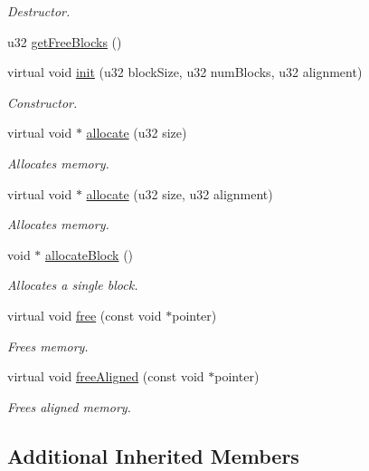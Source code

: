 \begin{DoxyCompactItemize}
\begin{DoxyCompactList}\small\item\em Destructor. \end{DoxyCompactList}\item 
u32 \hyperlink{classDE_1_1PoolAllocator_abb72ae0c4f9cc376cdab99095bd02575}{get\+Free\+Blocks} ()
\item 
virtual void \hyperlink{classDE_1_1PoolAllocator_acd4f99952bffbe85c229d85ca60b164b}{init} (u32 block\+Size, u32 num\+Blocks, u32 alignment)
\begin{DoxyCompactList}\small\item\em Constructor. \end{DoxyCompactList}\item 
virtual void $\ast$ \hyperlink{classDE_1_1PoolAllocator_a55472e9fd8cbe6455706c781c1b1f2d9}{allocate} (u32 size)
\begin{DoxyCompactList}\small\item\em Allocates memory. \end{DoxyCompactList}\item 
virtual void $\ast$ \hyperlink{classDE_1_1PoolAllocator_a06a558e5d2b8a09b0a38ad8c6a4e100e}{allocate} (u32 size, u32 alignment)
\begin{DoxyCompactList}\small\item\em Allocates memory. \end{DoxyCompactList}\item 
void $\ast$ \hyperlink{classDE_1_1PoolAllocator_a1213fac1617eb643b185e03704e1d0f1}{allocate\+Block} ()
\begin{DoxyCompactList}\small\item\em Allocates a single block. \end{DoxyCompactList}\item 
virtual void \hyperlink{classDE_1_1PoolAllocator_ac8566e6920e0f34f70c2f76758fbb68a}{free} (const void $\ast$pointer)
\begin{DoxyCompactList}\small\item\em Frees memory. \end{DoxyCompactList}\item 
virtual void \hyperlink{classDE_1_1PoolAllocator_af20c44a50efd12448f87b268e308fc92}{free\+Aligned} (const void $\ast$pointer)
\begin{DoxyCompactList}\small\item\em Frees aligned memory. \end{DoxyCompactList}\end{DoxyCompactItemize}
\subsection*{Additional Inherited Members}


